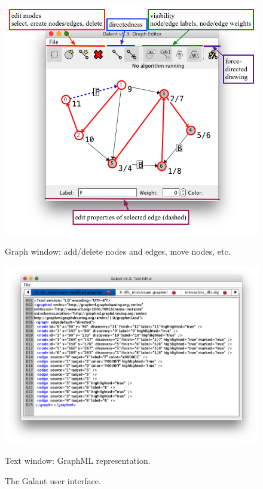 \begin{figure}
  \centering
    \includegraphics[scale=0.5]{X-graph_window-annotated}

    Graph window: add/delete nodes and edges, move nodes, etc.

    \includegraphics[scale=0.5]{X-dfs_midstream_modified-text}

    \vspace{-3ex}
    Text window: GraphML representation.

  \caption{The Galant user interface.}
  \label{fig:user_interface}
\end{figure}

